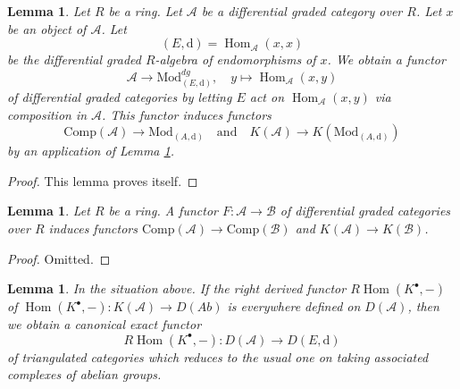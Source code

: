 \documentclass{stacks-project}
\theoremstyle{plain}
\newtheorem{lemma}[subsection]{Lemma}
\theoremstyle{definition}
\theoremstyle{remark}
\numberwithin{equation}{subsection}
\def\Hom{\mathop{\mathrm{Hom}}\nolimits}
\begin{document}
\begin{lemma}
\label{lemma-construction}
Let $R$ be a ring. Let $\mathcal{A}$ be a differential graded category
over $R$. Let $x$ be an object of $\mathcal{A}$. Let
$$
(E, \text{d}) = \Hom_\mathcal{A}(x, x)
$$
be the differential graded $R$-algebra of endomorphisms of $x$.
We obtain a functor
$$
\mathcal{A} \longrightarrow \text{Mod}^{dg}_{(E, \text{d})},\quad
y \longmapsto \Hom_\mathcal{A}(x, y)
$$
of differential graded categories by letting $E$ act on
$\Hom_\mathcal{A}(x, y)$ via composition in $\mathcal{A}$.
This functor induces functors
$$
\text{Comp}(\mathcal{A}) \to \text{Mod}_{(A, \text{d})}
\quad\text{and}\quad
K(\mathcal{A}) \to K(\text{Mod}_{(A, \text{d})})
$$
by an application of Lemma \ref{lemma-functorial}.
\end{lemma}

\begin{proof}
This lemma proves itself.
\end{proof}

\begin{lemma}
\label{lemma-functorial}
Let $R$ be a ring. A functor $F : \mathcal{A} \to \mathcal{B}$
of differential graded categories over $R$ induces functors
$\text{Comp}(\mathcal{A}) \to \text{Comp}(\mathcal{B})$
and $K(\mathcal{A}) \to K(\mathcal{B})$.
\end{lemma}

\begin{proof}
Omitted.
\end{proof}

\begin{lemma}
\label{lemma-existence-of-derived}
In the situation above. If the right derived functor $R\Hom(K^\bullet, -)$
of $\Hom(K^\bullet, -) : K(\mathcal{A}) \to D(\textit{Ab})$
is everywhere defined on $D(\mathcal{A})$, then we obtain a canonical exact
functor
$$
R\Hom(K^\bullet, -) : D(\mathcal{A}) \longrightarrow D(E, \text{d})
$$
of triangulated categories which reduces to the usual one  on taking
associated complexes of abelian groups.
\end{lemma}
\end{document}
